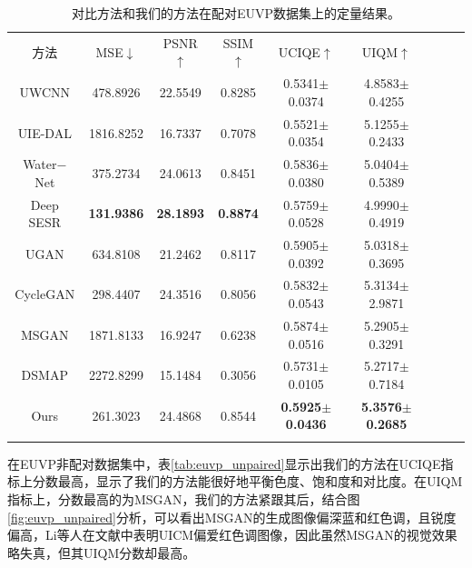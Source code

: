 \begin{table}[ht]%
\centering
\caption{对比方法和我们的方法在配对EUVP数据集上的定量结果。}
  \begin{tabular}{c|ccc|ccccc}
    \hline\noalign{\smallskip}
    方法 & MSE$\downarrow$ & PSNR$\uparrow$ & SSIM$\uparrow$ & UCIQE$\uparrow$ & UIQM$\uparrow$ \\
    \noalign{\smallskip}\hline\noalign{\smallskip}
    UWCNN\cite{li2020underwater} & 478.8926 & 22.5549 & 0.8285 & 0.5341$\pm$0.0374 & 4.8583$\pm$0.4255 \\
    UIE-DAL\cite{uplavikar2019all} & 1816.8252 & 16.7337 & 0.7078 & 0.5521$\pm$0.0354 & 5.1255$\pm$0.2433 \\
    Water$-$Net\cite{li2019underwater} & 375.2734 & 24.0613 & 0.8451 & 0.5836$\pm$0.0380 & 5.0404$\pm$0.5389 \\
    Deep SESR\cite{islam2020simultaneous} & \textbf{131.9386} & \textbf{28.1893} & \textbf{0.8874} & 0.5759$\pm$0.0528 & 4.9990$\pm$0.4919 \\
    UGAN\cite{fabbri2018enhancing} & 634.8108 & 21.2462 & 0.8117 & 0.5905$\pm$0.0392 & 5.0318$\pm$0.3695 \\
    CycleGAN\cite{zhu2017unpaired} & 298.4407 & 24.3516 & 0.8056 & 0.5832$\pm$0.0543 & 5.3134$\pm$2.9871 \\
    MSGAN\cite{mao2019mode} & 1871.8133 & 16.9247 & 0.6238 & 0.5874$\pm$0.0516 & 5.2905$\pm$0.3291 \\
    DSMAP\cite{chang2020domain} & 2272.8299 & 15.1484 & 0.3056 & 0.5731$\pm$0.0105 & 5.2717$\pm$0.7184 \\
    Ours & 261.3023 & 24.4868 & 0.8544 & \textbf{0.5925$\pm$0.0436} & \textbf{5.3576$\pm$0.2685} \\
    \noalign{\smallskip}\hline
  \end{tabular}
\label{tab:euvp_paired}
\end{table}

在EUVP非配对数据集中，表\ref{tab:euvp_unpaired}显示出我们的方法在UCIQE指标上分数最高，显示了我们的方法能很好地平衡色度、饱和度和对比度。在UIQM指标上，分数最高的为MSGAN，我们的方法紧跟其后，结合图\ref{fig:euvp_unpaired}分析，可以看出MSGAN的生成图像偏深蓝和红色调，且锐度偏高，Li等人在文献\cite{li2019underwater}中表明UICM偏爱红色调图像，因此虽然MSGAN的视觉效果略失真，但其UIQM分数却最高。

